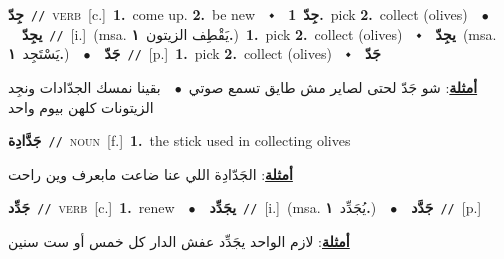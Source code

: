\documentclass[10pt,a4paper,twoside]{article} %
\begin{document}
\begin{multicols}{2}
{{{{{{{{{{{\setlength\topsep{0pt}\textbf{\foreignlanguage{arabic}{جِدّ}}\ {\color{gray}\texttt{//}\color{black}}\ \textsc{verb}\ [c.]\ \textbf{1.}~come up.  \textbf{2.}~be new\ \ $\smblkdiamond$\ \ \setlength\topsep{0pt}\textbf{\foreignlanguage{arabic}{جِدّ}}\ \textbf{1.}~pick  \textbf{2.}~collect (olives)\ \ $\bullet$\ \ \setlength\topsep{0pt}\textbf{\foreignlanguage{arabic}{يجِدّ}}\ {\color{gray}\texttt{//}\color{black}}\ [i.]\ \color{gray}(msa. \foreignlanguage{arabic}{يَقْطِف الزيتون}~\foreignlanguage{arabic}{\textbf{١.}})\color{black}\ \textbf{1.}~pick  \textbf{2.}~collect (olives)\ \ $\smblkdiamond$\ \ \setlength\topsep{0pt}\textbf{\foreignlanguage{arabic}{يجِدّ}}\ \color{gray}(msa. \foreignlanguage{arabic}{يَسْتَجِد}~\foreignlanguage{arabic}{\textbf{١.}})\color{black}\ \ $\bullet$\ \ \setlength\topsep{0pt}\textbf{\foreignlanguage{arabic}{جَدّ}}\ {\color{gray}\texttt{//}\color{black}}\ [p.]\ \textbf{1.}~pick  \textbf{2.}~collect (olives)\ \ $\smblkdiamond$\ \ \setlength\topsep{0pt}\textbf{\foreignlanguage{arabic}{جَدّ}}\  \begin{flushright}\color{gray}\foreignlanguage{arabic}{\textbf{\underline{\foreignlanguage{arabic}{أمثلة}}}: شو جَدّ لحتى لصاير مش طايق تسمع صوتي\ $\bullet$\ \  بقينا نمسك الجدّادات ونجِد الزيتونات كلهن بيوم واحد}\end{flushright}\color{black}} \vspace{2mm}

{\setlength\topsep{0pt}\textbf{\foreignlanguage{arabic}{جَدَّادِة}}\ {\color{gray}\texttt{//}\color{black}}\ \textsc{noun}\ [f.]\ \textbf{1.}~the stick used in collecting olives\  \begin{flushright}\color{gray}\foreignlanguage{arabic}{\textbf{\underline{\foreignlanguage{arabic}{أمثلة}}}: الجَدّادِة اللي  عنا ضاعت مابعرف وين راحت}\end{flushright}\color{black}} \vspace{2mm}

{\setlength\topsep{0pt}\textbf{\foreignlanguage{arabic}{جَدِّد}}\ {\color{gray}\texttt{//}\color{black}}\ \textsc{verb}\ [c.]\ \textbf{1.}~renew\ \ $\bullet$\ \ \setlength\topsep{0pt}\textbf{\foreignlanguage{arabic}{يجَدِّد}}\ {\color{gray}\texttt{//}\color{black}}\ [i.]\ \color{gray}(msa. \foreignlanguage{arabic}{يُجَدِّد}~\foreignlanguage{arabic}{\textbf{١.}})\color{black}\ \ $\bullet$\ \ \setlength\topsep{0pt}\textbf{\foreignlanguage{arabic}{جَدَّد}}\ {\color{gray}\texttt{//}\color{black}}\ [p.]\  \begin{flushright}\color{gray}\foreignlanguage{arabic}{\textbf{\underline{\foreignlanguage{arabic}{أمثلة}}}: لازم الواحد يجَدِّد عفش الدار كل خمس أو ست سنين}\end{flushright}\color{black}} \vspace{2mm}

}}}}}}}}}}
\end{multicols}
\end{document}
